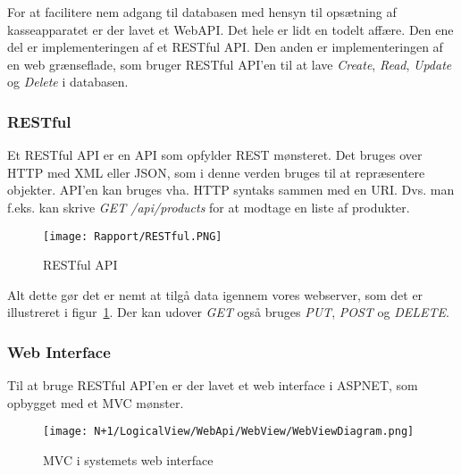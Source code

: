 For at facilitere nem adgang til databasen med hensyn til 
opsætning af kasseapparatet er der lavet et \gls{WebAPI}. 
Det hele er lidt en todelt affære. Den ene del er implementeringen af et \gls{RESTful} \gls{API}. 
Den anden er implementeringen af en web grænseflade, som bruger \gls{RESTful} \gls{API}'en til at lave \textit{Create}, \textit{Read}, \textit{Update} og \textit{Delete} i databasen.

\subsubsection{RESTful}
Et \gls{RESTful} \gls{API} er en \gls{API} som opfylder \gls{REST} mønsteret. Det bruges over \gls{HTTP} med XML eller JSON, som i denne verden bruges til at repræsentere objekter.
\gls{API}'en kan bruges vha. \gls{HTTP} syntaks sammen med en \gls{URI}. Dvs. man f.eks. kan skrive \textit{GET /api/products} for at modtage en liste af produkter. 

\begin{figure}[H]
    \centering
	\texttt{[image: Rapport/RESTful.PNG]}
	\caption{RESTful API}
	\label{fig:RESTfulApi}
\end{figure} 

Alt dette gør det er nemt at tilgå data igennem vores webserver, som det er illustreret i figur~\ref{fig:RESTfulApi}. Der kan udover \textit{GET} også bruges \textit{PUT}, \textit{POST} og \textit{DELETE}. 

\subsubsection{Web Interface}
Til at bruge \gls{RESTful} \gls{API}'en er der lavet et web interface i \gls{ASPNET}, som opbygget med et \gls{MVC} mønster.

\begin{figure}[H]
    \centering
	\texttt{[image: N+1/LogicalView/WebApi/WebView/WebViewDiagram.png]}
	\caption{MVC i systemets web interface}
	\label{fig:MVCWebApi}
\end{figure}

